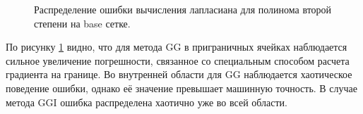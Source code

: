 \begin{figure}[H]
    \centering
    \caption{Распределение ошибки вычисления лапласиана для полинома второй степени на base сетке.}
    \label{fig:23}
\end{figure}
По рисунку \ref{fig:23} видно, что для метода GG в приграничных ячейках
наблюдается сильное увеличение погрешности, связанное со специальным
способом расчета градиента на границе. Во внутренней области для GG
наблюдается хаотическое поведение ошибки, однако её значение превышает
машинную точность. В случае метода GGI ошибка распределена хаотично уже
во всей области.

